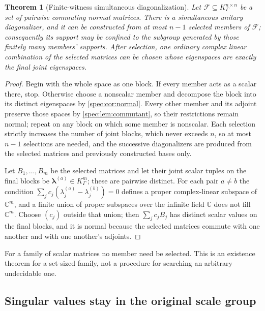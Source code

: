 \documentclass[11pt,a4paper]{article}
\numberwithin{equation}{section}
\newtheorem{theorem}{Theorem}[section]
\theoremstyle{definition}
\theoremstyle{remark}
\newcommand{\C}{\mathbb C}
\begin{document}
\begin{theorem}[Finite-witness simultaneous diagonalization]\label{spec:thm:simultaneous}
Let $\mathcal F\subseteq K_\Gamma^{n\times n}$ be a set of pairwise
commuting normal matrices. There is a simultaneous unitary diagonalizer, and
it can be constructed from at most $n-1$ selected members of $\mathcal F$;
consequently its support may be confined to the subgroup generated by those
finitely many members' supports. After selection, one ordinary complex
linear combination of the selected matrices can be chosen whose eigenspaces
are exactly the final joint eigenspaces.
\end{theorem}
\begin{proof}
Begin with the whole space as one block. If every member acts as a scalar
there, stop. Otherwise choose a nonscalar member and decompose the block
into its distinct eigenspaces by \cref{spec:cor:normal}. Every other member
and its adjoint preserve those spaces by \cref{spec:lem:commutant}, so their
restrictions remain normal; repeat on any block on which some member is
nonscalar. Each selection strictly increases the number of joint blocks,
which never exceeds $n$, so at most $n-1$ selections are needed, and the
successive diagonalizers are produced from the selected matrices and
previously constructed bases only.

Let $B_1,\ldots,B_m$ be the selected matrices and let their joint scalar
tuples on the final blocks be $\boldsymbol\lambda^{(a)}\in K_\Gamma^m$;
these are pairwise distinct. For each pair $a\ne b$ the condition
$\sum_jc_j(\lambda_j^{(a)}-\lambda_j^{(b)})=0$ defines a proper
complex-linear subspace of $\C^m$, and a finite union of proper subspaces
over the infinite field $\C$ does not fill $\C^m$. Choose $(c_j)$ outside
that union; then $\sum_jc_jB_j$ has distinct scalar values on the final
blocks, and it is normal because the selected matrices commute with one
another and with one another's adjoints.
\end{proof}

For a family of scalar matrices no member need be selected. This is an
existence theorem for a set-sized family, not a procedure for searching an
arbitrary undecidable one.

\subsection{Singular values stay in the original scale group}
\end{document}
